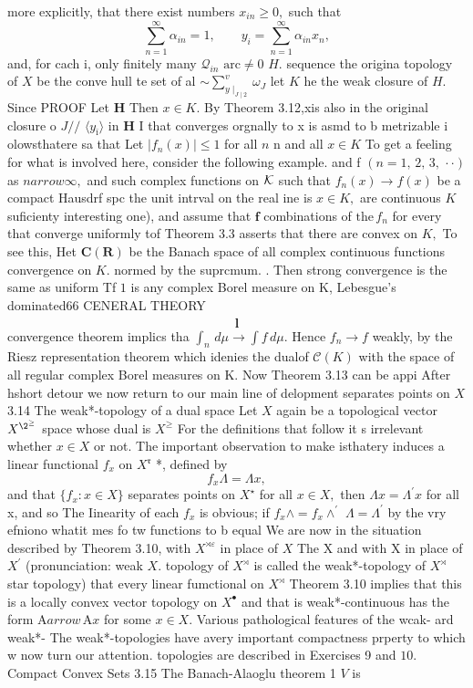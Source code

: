 more explicitly, that there exist numbers $x_{i n}\geq0,$ such that $$ \sum_{n=1}^{\infty}\alpha_{i n}=1,\qquad y_{i}=\sum_{n=1}^{\infty}\alpha_{i n}x_{n}, $$ and, for cach i, only finitely many ${\mathcal{Q}}_{i n}$ ${\mathrm{arc}}\neq0$ $H.$ sequence the origina topology of $\textstyle X$ be the conve hull te set of al $\sim\sum_{y\mid_{J\mid2}}^{v}\omega_{J}$ let $\textstyle K$ he the weak closure of $H.$ Since PROOF Let ${\boldsymbol{H}}$ Then $x\in K.$ By Theorem 3.12,xis also in the original closure o $J/\slash$ $\langle y_{\bar{\imath}}\rangle$ in ${\boldsymbol{H}}$ I that converges orgnally to x is asmd to b metrizable i olowsthatere sa that Let $|f_{n}(x)|\leqslant1$ for all $\scriptstyle n$ n and all $x\in K$ To get a feeling for what is involved here, consider the following example. and f $(n=1,\,2,\,3,\,\cdot\cdot)$ as $n arrow\infty,$ and such complex functions on ${\cal K}$ such that $f_{n}(x)\to f(x)$ be a compact Hausdrf spc the unit intrval on the real ine is $x\in K,$ are continuous $\textstyle K$ suficienty interesting one), and assume that $\boldsymbol{f}$ combinations of $\mathrm{the}\,f_{n}$ for every that converge uniformly tof Theorem 3.3 asserts that there are convex on $K,$ To see this, Het ${\boldsymbol{C}}({\boldsymbol{R}})$ be the Banach space of all complex continuous functions convergence on $K.$ normed by the suprcmum. . Then strong convergence is the same as uniform Tf $\boldsymbol{\mathit{1}}$ is any complex Borel measure on K, Lebesgue's dominated66 CENERAL THEORY $$ \hat{\boldsymbol{l}} $$ convergence theorem implics tha $\textstyle{\int}_{n}\,d\mu\to{\int}f\,d\mu.$ Hence $f_{n}\to f$ weakly, by the Riesz representation theorem which idenies the dualof ${\mathcal{C}}(K)$ with the space of all regular complex Borel measures on K. Now Theorem 3.13 can be appi After hshort detour we now return to our main line of delopment separates points on $X$ 3.14 The weak*-topology of a dual space Let $\textstyle X$ again be a topological vector $X^{\2{^{\geq}}}$ space whose dual is $X^{\geq}$ For the definitions that follow it s irrelevant whether $x\in X$ or not. The important observation to make isthatery induces a linear functional $f_{x}$ on $X^{\mathfrak{r}}$ *, defined by $$ f_{x}\Lambda=\Lambda x, $$ and that $\{f_{x}:x\in X\}$ separates points on $X^{\star}$ for all $x\in X,$ then $\Lambda x=\Lambda^{\prime}x$ for all x, and so The Iinearity of each $f_{x}$ is obvious; if $f_{x}\wedge=f_{x}\wedge^{\prime}$ $\Lambda=\Lambda^{\prime}$ by the vry efniono whatit mes fo tw functions to b equal We are now in the situation described by Theorem 3.10, with $X^{\rtimes\varepsilon}$ in place of $X$ The X and with X in place of $\textstyle X^{\prime}$ (pronunciation: weak $X.$ topology of $X^{\rtimes}$ is called the weak*-topology of $X^{\rtimes}$ star topology) that every linear fumctional on $X^{\rtimes}$ Theorem 3.10 implies that this is a locally convex vector topology on $X^{\bullet}$ and that is weak*-continuous has the form $\mathrm{A}{ arrow}\,\mathrm{A}x$ for some $x\in X.$ Various pathological features of the wcak- ard weak*- The weak*-topologies have avery important compactness prperty to which w now turn our attention. topologies are described in Exercises 9 and $10.$ Compact Convex Sets 3.15 The Banach-Alaoglu theorem 1 ${\mathbf{}}V$ is 
